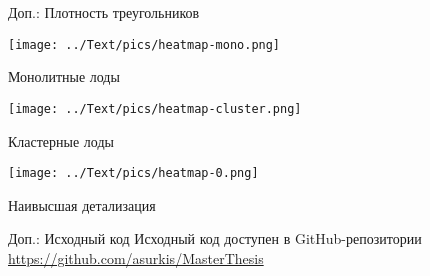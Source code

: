 \begin{frame}{Доп.: Плотность треугольников}
    \begin{center}
        \begin{minipage}{.45\textwidth}
            \begin{center}
                \texttt{[image: ../Text/pics/heatmap-mono.png]}

                Монолитные лоды
            \end{center}
        \end{minipage}
        \begin{minipage}{.45\textwidth}
            \begin{center}
                \texttt{[image: ../Text/pics/heatmap-cluster.png]}

                Кластерные лоды
            \end{center}
        \end{minipage}
        \begin{minipage}{.45\textwidth}
            \begin{center}
                \texttt{[image: ../Text/pics/heatmap-0.png]}

                Наивысшая детализация
            \end{center}
        \end{minipage}
    \end{center}
\end{frame}

\begin{frame}{Доп.: Исходный код}
    Исходный код доступен в GitHub-репозитории\\
    \url{https://github.com/asurkis/MasterThesis}

    \bigskip

    \begin{center}
    \end{center}
\end{frame}
